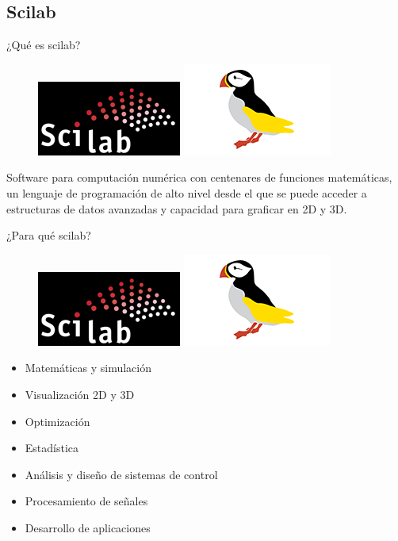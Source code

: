 \documentclass{beamer}
\begin{document}
\subsection[Scilab - \url{http://www.scilab.org}]{Scilab}

\begin{frame}{¿Qué es scilab?}
  \begin{figure}
    \centering
    \includegraphics{scilab/img/Scilab-WebSite.png}
    \includegraphics{scilab/img/Puffin-Logo_medium}
  \end{figure}
  Software para computación numérica con centenares de funciones matemáticas, un lenguaje de programación de alto nivel desde el que se puede acceder a estructuras de datos avanzadas y capacidad para graficar en 2D y 3D.
\end{frame}

\begin{frame}{¿Para qué scilab?}
  \begin{figure}
    \centering
    \includegraphics{scilab/img/Scilab-WebSite.png}
    \includegraphics{scilab/img/Puffin-Logo_medium}
  \end{figure}
  \begin{itemize}
  \item Matemáticas y simulación
  \item Visualización 2D y 3D
  \item Optimización
  \item Estadística
  \item Análisis y diseño de sistemas de control
  \item Procesamiento de señales
  \item Desarrollo de aplicaciones
  \end{itemize}
\end{frame}
\end{document}
